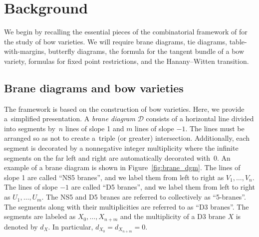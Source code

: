 \documentclass[pdftex]{sigma}
\numberwithin{equation}{section}
\newcommand{\brane}{\mathcal D}
\begin{document}
\section{Background} \label{sec:background}
We begin by recalling the essential pieces of the combinatorial framework of \cite{RS} for the study of bow varieties. We will require brane diagrams, tie diagrams, table-with-margins, butterfly diagrams, the formula for the tangent bundle of a bow variety, formulas for fixed point restrictions, and the Hanany--Witten transition.

\subsection{Brane diagrams and bow varieties}
The \cite{RS} framework is based on the \cite{NT} construction of bow varieties. Here, we provide a~simplified presentation. A \textit{brane diagram} $\brane$ consists of a horizontal line divided into segments by~$n$ lines of slope 1 and $m$ lines of slope $-1$. The lines must be arranged so as not to create a~triple (or greater) intersection. Additionally, each segment is decorated by a nonnegative integer multiplicity where the infinite segments on the far left and right are automatically decorated with~0. An example of a brane diagram is shown in Figure~\ref{fig:brane_dgm}. The lines of slope 1 are called ``NS5 branes'', and we label them from left to right as $V_1, \dots , V_n$. The lines of slope $-1$ are called ``D5 branes'', and we label them from left to right as $U_1, \dots , U_m$. The NS5 and D5 branes are referred to collectively as ``5-branes''. The segments along with their multiplicities are referred to as ``D3 branes''. The segments are labeled as $X_0, \dots , X_{n + m}$ and the multiplicity of a D3 brane $X$ is denoted by $d_X$. In particular, $d_{X_0} = d_{X_{n + m}} = 0$.
\end{document}
